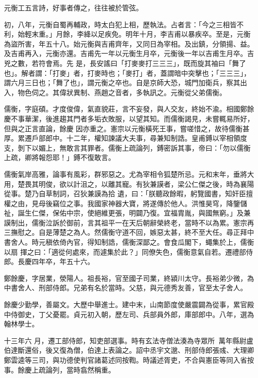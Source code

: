 \begin{pinyinscope}
 元衡工五言詩，好事者傳之，往往被於管弦。



 初，八年，元衡自蜀再輔政，時太白犯上相，歷執法。占者言：「今之三相皆不利，始輕末重。」月餘，李絳以足疾免。明年十月，李吉甫以暴疾卒。至是，元衡為盜所害，年五十八。始元衡與吉甫齊年，又同日為宰相。及出鎮，分領揚、益。及吉甫再入，元衡亦還。吉甫先一年以元衡生月卒，元衡後一年以吉甫生月卒。吉兇之數，若符會焉。先
 是，長安謠曰「打麥麥打三三三」，既而旋其袖曰「舞了也」。解者謂：「打麥」者，打麥時也；「麥打」者，蓋謂暗中突擊也；「三三三」，謂六月三日也；「舞了也」，謂元衡之卒也。自是京師大恐，城門加衛兵，察其出入，物色伺之。其偉狀異制、燕趙之音者，多執訊之。元衡從父弟儒衡。



 儒衡，字庭碩。才度俊偉，氣直貌莊，言不妄發，與人交友，終始不渝。相國鄭餘慶不事華潔，後進趨其門者多垢衣敗服，以望其知。而儒衡謁見，未嘗輒易所好，但與之正言直論，餘慶
 因亦重之。憲宗以元衡橫死王事，嘗嗟惜之，故待儒衡甚厚。累遷戶部郎中。十二年，權知諫議大夫事，尋兼知制誥。皇甫鎛以宰相領度支，剝下以媚上，無敢言其罪者。儒衡上疏論列，鎛密訴其事，帝曰：「勿以儒衡上疏，卿將報怨耶！」鎛不復敢言。



 儒衡氣岸高雅，論事有風彩，群邪惡之。尤為宰相令狐楚所忌。元和末年，垂將大用，楚畏其明俊，欲以計沮之，以離其寵。有狄兼謨者，梁公仁傑之後，時為襄陽從事。楚乃自草制詞，召狄兼謨為拾
 遺，曰：「朕聽政餘暇，躬覽國書，知奸臣擅權之由，見母後竊位之事。我國家神器大寶，將遂傳於他人。洪惟昊穹，降鑒儲祉，誕生仁傑，保佑中宗，使絕維更張，明闢乃復。宜福胄胤，與國無窮。」及兼謨制出，儒衡泣訴於御前，言其祖平一在天后朝辭榮終老，當時不以為累。憲宗再三撫慰之。自是薄楚之為人。然儒衡守道不回，嫉惡太甚，終不至大任。尋正拜中書舍人。時元稹依倚內官，得知制誥，儒衡深鄙之。會食瓜閣下，蠅集於上，儒衡以扇
 揮之曰：「適從何處來，而遽集於此？」同僚失色，儒衡意氣自若。遷禮部侍郎。長慶四年卒，年五十六。



 鄭餘慶，字居業，滎陽人。祖長裕，官至國子司業，終潁川太守。長裕弟少微，為中書舍人、刑部侍郎。兄弟有名於當時。父慈，與元德秀友善，官至太子舍人。



 餘慶少勤學，善屬文。大歷中舉進士。建中末，山南節度使嚴震闢為從事，累官殿中侍御史，丁父憂罷。貞元初入朝，歷左司、兵部員外郎，庫部郎中。八年，選為翰林學士。



 十三年六
 月，遷工部侍郎，知吏部選事。時有玄法寺僧法湊為寺眾所，萬年縣尉盧伯達斷還俗，後又復為僧，伯達上表論之。詔中丞宇文邈、刑部侍郎張彧、大理卿鄭雲逵等三司，與功德使判官諸葛述同按鞫。時議述胥吏，不合與憲臣等同入省按事。餘慶上疏論列，當時翕然稱重。




\end{pinyinscope}
